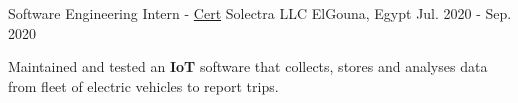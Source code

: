 

\begin{cventries}

   \cventry
     {Software Engineering Intern - \tiny{\href{https://gitlab.com/mido3ds/cv/raw/master/certs/solectra.pdf}{Cert}}} %
     {Solectra LLC} %
     {ElGouna, Egypt} %
     {Jul. 2020 - Sep. 2020} %
     {
       \begin{cvitems} %
       \item{Maintained and tested an \textbf{IoT} software that collects, stores and analyses data from fleet of electric vehicles to report trips.}
       \end{cvitems}
     }

\end{cventries}
